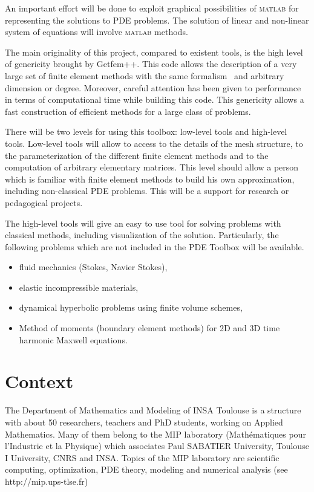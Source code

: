 \documentclass[11pt,a4paper]{article}
\begin{document}
An important effort will be done to exploit graphical possibilities of 
\textsc{matlab} for representing the solutions to PDE problems. The solution
of linear and non-linear system of equations will involve \textsc{matlab}
methods.

The main originality of this project, compared to existent tools, is the
high level of genericity brought by Getfem++. This code allows the
description of  a very large set of finite element methods with the same
formalism \ and arbitrary dimension or degree. Moreover, careful attention
has been given to performance in terms of computational time while building
this code. This genericity allows a fast construction of efficient methods
for a large class of problems. 

There will be two levels for using this toolbox: low-level tools and
high-level tools. Low-level tools will allow to access to the details of the
mesh structure, to the parameterization of the different finite element
methods and  to the computation of arbitrary elementary matrices. This level
should allow a person which is familiar with finite element methods to build
his own approximation, including non-classical PDE problems. This will be a
support for research or pedagogical projects.

The high-level tools will give an easy to use tool for solving problems with
classical methods, including visualization of the solution. Particularly,
the following problems which are not included in the PDE Toolbox will be
available.
\begin{itemize}
\item  fluid mechanics (Stokes, Navier Stokes),

\item  elastic incompressible materials,

\item  dynamical hyperbolic problems using finite volume schemes,

\item  Method of moments (boundary element methods) for 2D and 3D time harmonic Maxwell equations.
\end{itemize}

\section{Context}

The Department of Mathematics and Modeling of INSA Toulouse is a structure
with about 50 researchers, teachers and PhD students, working on Applied
Mathematics. Many of them belong to the MIP laboratory (Math\'{e}matiques
pour l'Industrie et la Physique) which associates Paul SABATIER University,
Toulouse I University, CNRS and INSA. Topics of the MIP laboratory are
scientific computing, optimization, PDE theory, modeling and numerical
analysis (see http://mip.ups-tlse.fr) 
\end{document}
